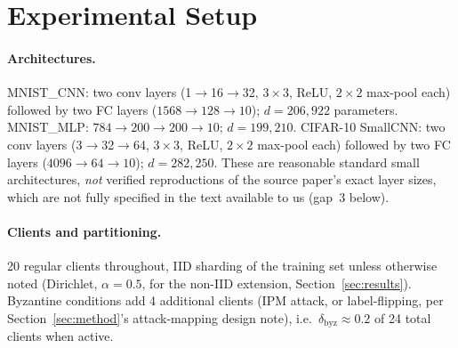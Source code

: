 \documentclass{article}
\begin{document}
\section{Experimental Setup}
\label{sec:setup}

\paragraph{Architectures.} MNIST\_CNN: two conv layers (1$\to$16$\to$32,
$3{\times}3$, ReLU, $2{\times}2$ max-pool each) followed by two FC layers
($1568{\to}128{\to}10$); $d=206{,}922$ parameters. MNIST\_MLP: $784{\to}200{\to}
200{\to}10$; $d=199{,}210$. CIFAR-10 SmallCNN: two conv layers (3$\to$32$\to$64,
$3{\times}3$, ReLU, $2{\times}2$ max-pool each) followed by two FC layers
($4096{\to}64{\to}10$); $d=282{,}250$. These are reasonable standard small
architectures, \emph{not} verified reproductions of the source paper's exact
layer sizes, which are not fully specified in the text available to us
(gap~3 below).

\paragraph{Clients and partitioning.} 20 regular clients throughout, IID
sharding of the training set unless otherwise noted (Dirichlet, $\alpha=0.5$,
for the non-IID extension, Section~\ref{sec:results}). Byzantine conditions add
4 additional clients (IPM attack, or label-flipping, per
Section~\ref{sec:method}'s attack-mapping design note), i.e.\ $\delta_{\mathrm{byz}}
\approx 0.2$ of 24 total clients when active.
\end{document}
